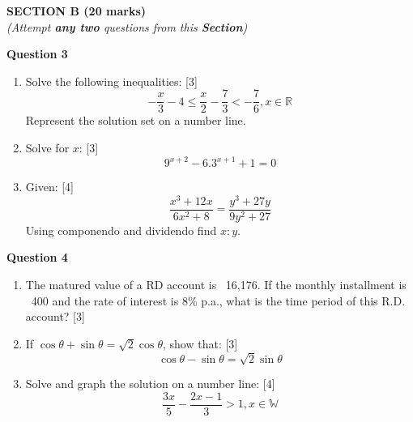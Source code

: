 \newpage
\begin{center}
   \large
   \textbf{SECTION B (20 marks)}\\
   \vspace{5mm}
   \normalsize
   \textit{(Attempt \textbf{any two} questions from this \textbf{Section})}
\end{center}
\par

\noindent
\textbf{Question 3}
\begin{enumerate}[label=(\roman*)]

    \item Solve the following inequalities: \hfill [3]
        \[
            -\frac{x}{3} - 4 \leq \frac{x}{2} - \frac{7}{3} < -\frac{7}{6}, x \in \mathbb{R}
        \]
        Represent the solution set on a number line.

    \item Solve for $x$: \hfill [3]
        \[
            9^{x+2} - 6.3^{x+1} + 1 = 0 
        \]

    \item Given: \hfill [4]
        \[
            \frac{x^3 + 12x}{6x^2 + 8} = \frac{y^3 + 27y}{9y^2 + 27}
        \]
        Using componendo and dividendo find $x:y$.

\end{enumerate}

\noindent
\textbf{Question 4}
\begin{enumerate}[label=(\roman*)]

    \item The matured value of a RD account is \rupee~16,176. 
        If the monthly installment is \rupee~400 and the rate 
        of interest is 8\% p.a., what is the time period of
        this R.D. account? \hfill [3]

    \item If $\cos \theta + \sin \theta = \sqrt{2} \cos \theta$, show that: \hfill [3]
        \[
            \cos \theta - \sin \theta = \sqrt{2} \sin \theta
        \]

    \item Solve and graph the solution on a number line: \hfill [4]
        \[
            \frac{3x}{5} - \frac{2x-1}{3} > 1, x \in \mathbb{W}
        \]

\end{enumerate}

